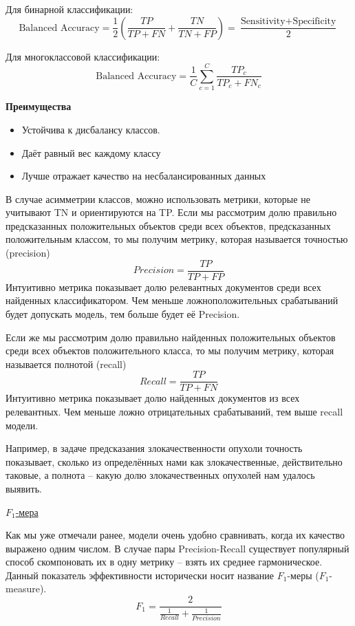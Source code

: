\begin{definition}
    Для бинарной классификации:
    \[ \text{Balanced Accuracy} = \frac{1}{2} \left( \frac{TP}{TP+FN} + \frac{TN}{TN+FP} \right) =
    \frac{\text{Sensitivity} + \text{Specificity}}{2} \]
    
    Для многоклассовой классификации:
    \[ \text{Balanced Accuracy} = \frac{1}{C} \sum_{c=1}^C \frac{TP_c}{TP_c + FN_c} \]
\end{definition}

\textbf{Преимущества}
\begin{itemize}
    \item Устойчива к дисбалансу классов.
    \item Даёт равный вес каждому классу
    \item Лучше отражает качество на несбалансированных данных
\end{itemize}


В случае асимметрии классов, можно использовать метрики, которые не учитывают TN и ориентируются на TP\@.
Если мы рассмотрим долю правильно предсказанных положительных объектов среди всех объектов, предсказанных
положительным классом, то мы получим метрику, которая называется точностью (precision)
\[ Precision = \frac{TP}{TP+FP} \]
Интуитивно метрика показывает долю релевантных документов среди всех найденных классификатором.
Чем меньше ложноположительных срабатываний будет допускать модель, тем больше будет её Precision.

Если же мы рассмотрим долю правильно найденных положительных объектов среди всех объектов положительного класса, то
мы получим метрику, которая называется полнотой (recall)
\[ Recall = \frac{TP}{TP+FN} \]
Интуитивно метрика показывает долю найденных документов из всех релевантных.
Чем меньше ложно отрицательных срабатываний, тем выше recall модели.

Например, в задаче предсказания злокачественности опухоли точность показывает, сколько из определённых нами как
злокачественные, действительно таковые, а полнота -- какую долю злокачественных опухолей нам удалось выявить.

\underline{$F_1$-мера}

Как мы уже отмечали ранее, модели очень удобно сравнивать, когда их качество выражено одним числом.
В случае пары Precision-Recall существует популярный способ скомпоновать их в одну метрику -- взять их среднее
гармоническое.
Данный показатель эффективности исторически носит название $F_1$-меры ($F_1$-measure).
\[ F_1 = \frac{2}{\frac{1}{Recall} + \frac{1}{Precision}} \]

